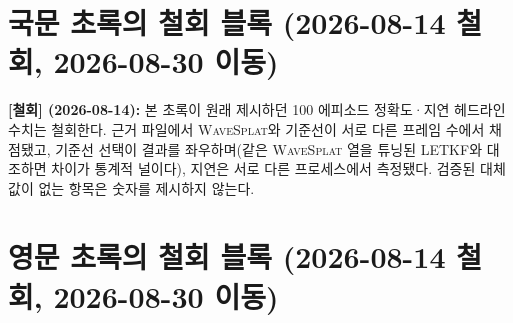 \documentclass[11pt]{report}
\numberwithin{equation}{chapter}
\numberwithin{figure}{chapter}
\numberwithin{table}{chapter}
\newcommand{\WS}{\textsc{WaveSplat}}
\begin{document}
\section{국문 초록의 철회 블록 (2026-08-14 철회, 2026-08-30 이동)}

\textbf{[철회] (2026-08-14):} 본 초록이 원래 제시하던 100 에피소드 정확도·지연 헤드라인
수치는 철회한다. 근거 파일에서 \WS{}와 기준선이 서로 다른 프레임 수에서 채점됐고,
기준선 선택이 결과를 좌우하며(같은 \WS{} 열을 튜닝된 LETKF와 대조하면 차이가 통계적 널이다),
지연은 서로 다른 프로세스에서 측정됐다.
검증된 대체값이 없는 항목은 숫자를 제시하지 않는다.

\section{영문 초록의 철회 블록 (2026-08-14 철회, 2026-08-30 이동)}
\end{document}
